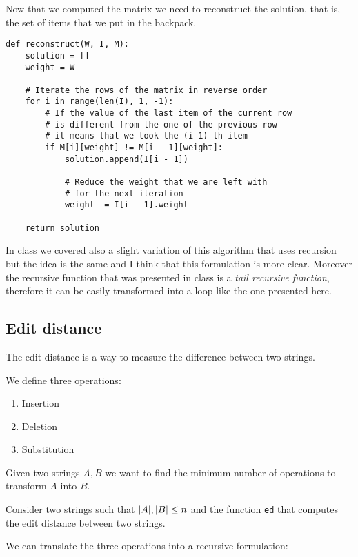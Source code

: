 \documentclass[12pt]{extarticle}
\begin{document}
Now that we computed the matrix we need to reconstruct the solution, that is, the set of items that we put in the backpack.

\begin{verbatim}
def reconstruct(W, I, M):
    solution = []
    weight = W

    # Iterate the rows of the matrix in reverse order
    for i in range(len(I), 1, -1):
        # If the value of the last item of the current row
        # is different from the one of the previous row
        # it means that we took the (i-1)-th item
        if M[i][weight] != M[i - 1][weight]:
            solution.append(I[i - 1])

            # Reduce the weight that we are left with
            # for the next iteration
            weight -= I[i - 1].weight
    
    return solution
\end{verbatim}


\begin{remark}
    In class we covered also a slight variation of this algorithm that uses recursion but the idea is the same and I think that this formulation is more clear.
    Moreover the recursive function that was presented in class is a \emph{tail recursive function}, therefore it can be easily transformed into a loop like the one presented here.
\end{remark}

\subsection{Edit distance}

The edit distance is a way to measure the difference between two strings.

We define three operations:
\begin{enumerate}
    \item Insertion
    \item Deletion
    \item Substitution
\end{enumerate}

Given two strings $A, B$ we want to find the minimum number of operations to transform $A$ into $B$.

Consider two strings such that $\abs{A}, \abs{B} \leq n$ and the function \texttt{ed} that computes the edit distance between two strings.

We can translate the three operations into a recursive formulation:
\end{document}

